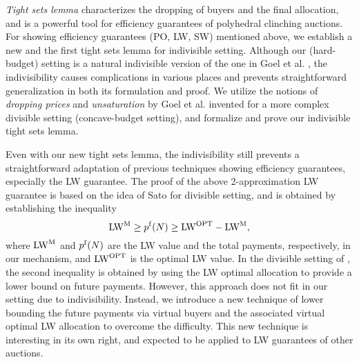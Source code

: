 \documentclass[letterpaper,11pt]{article}
\begin{document}
{\it Tight sets lemma} \cite{GMP2014,GMP2015} characterizes the dropping of buyers and the 
final allocation, and is a powerful tool for efficiency guarantees of  
polyhedral clinching auctions. 
For showing efficiency guarantees (PO, LW, SW) mentioned above, 
we establish a new and the first tight sets lemma for indivisible setting. 
Although our (hard-budget) setting is a natural indivisible version of 
the one in Goel et al. \cite{GMP2015},  
the indivisibility causes complications in various places 
and prevents straightforward generalization in both its formulation and proof. 
We utilize the notions of {\it dropping prices} and {\it unsaturation}
by Goel et al. \cite{GMP2014} invented for a more complex divisible setting 
(concave-budget setting), and formalize and prove our indivisible tight sets lemma.

Even with our new tight sets lemma,
the indivisibility still prevents a straightforward adaptation
of previous techniques showing efficiency guarantees,
especially the LW guarantee.
The proof of the above 2-approximation LW guarantee
is based on the idea of Sato \cite{S2023} for divisible setting, 
and is obtained by establishing the inequality
\[
{\rm LW}^{\rm M} \geq p^{\rm f}(N) \geq {\rm LW}^{\rm OPT} - {\rm LW}^{\rm M},
\]
where ${\rm LW}^{\rm M}$ and $p^{\rm f}(N)$ 
are the LW value and the total payments, respectively, in our mechanism, 
and ${\rm LW}^{\rm OPT}$ is the optimal LW value.
In the divisible setting of \cite{S2023}, the second inequality is obtained
by using the LW optimal allocation to provide a lower bound on future payments.
However, this approach does not fit in our setting due to indivisibility.
Instead, we introduce a new technique of lower bounding the future payments
via virtual buyers and the associated virtual optimal LW allocation
to overcome the difficulty.
This new technique is interesting in its own right,
and expected to be applied to LW guarantees of other auctions.

\end{document}
